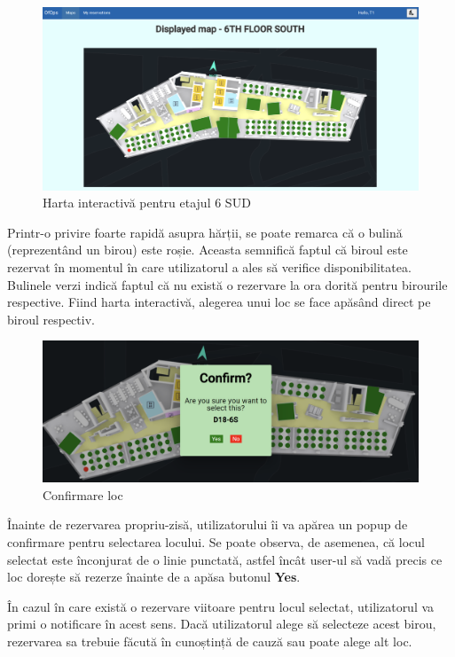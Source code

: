 \newpage

\begin{figure}[!htb]
    \centering
    \includegraphics[width=0.9\linewidth]{images/hartaint.png}
    \caption{Harta interactivă pentru etajul 6 SUD}
    \label{fig:hartaint}
\end{figure}

Printr-o privire foarte rapidă asupra hărții, se poate remarca că o bulină (reprezentând un birou) este roșie. Aceasta semnifică faptul că biroul este rezervat în momentul în care utilizatorul a ales să verifice disponibilitatea. Bulinele verzi indică faptul că nu există o rezervare la ora dorită pentru birourile respective. Fiind harta interactivă, alegerea unui loc se face apăsând direct pe biroul respectiv.

\begin{figure}[!htb]
    \centering
    \includegraphics[width=0.9\linewidth]{images/rezerv.png}
    \caption{Confirmare loc}
    \label{fig:rezerv}
\end{figure}

Înainte de rezervarea propriu-zisă, utilizatorului îi va apărea un popup de confirmare pentru selectarea locului. Se poate observa, de asemenea, că locul selectat este înconjurat de o linie punctată, astfel încât user-ul să vadă precis ce loc dorește să rezerze înainte de a apăsa butonul \textbf{Yes}.

În cazul în care există o rezervare viitoare pentru locul selectat, utilizatorul va primi o notificare în acest sens. Dacă utilizatorul alege să selecteze acest birou, rezervarea sa trebuie făcută în cunoștință de cauză sau poate alege alt loc.

